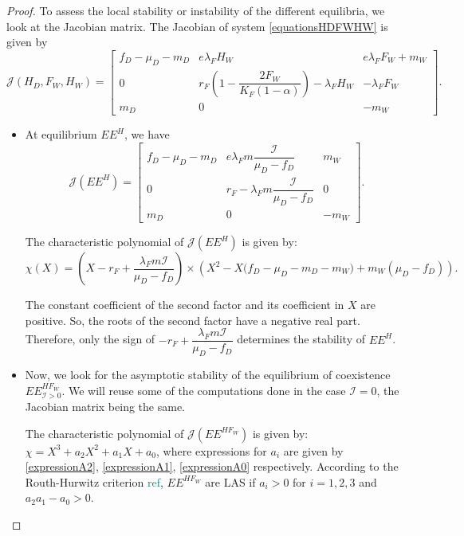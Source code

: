 \documentclass{article}
\newcommand{\lfw}{\lambda_{F}}
\newcommand{\lfw}{\lambda_{F}}
\newcommand{\cI}{\mathcal{I}}
\newcommand{\marc}[1]{\textcolor{teal}{#1}}
\begin{document}
\begin{proof}
To assess the local stability or instability of the different equilibria, we look at the Jacobian matrix. The Jacobian of system \eqref{equationsHDFWHW} is given by
\begin{equation*}
\mathcal{J}(H_D, F_W, H_W) = \begin{bmatrix}
f_D-\mu_D - m_D & e \lfw H_W & e\lfw F_W + m_W \\
0 & r_F \left( 1 - \dfrac{2F_W}{K_F(1-\alpha)} \right) - \lfw H_W & - \lfw F_W \\
m_D & 0 & -m_W
\end{bmatrix}.
\end{equation*}
\begin{itemize}
\item At equilibrium $EE^{H}$, we have
\begin{equation*}
\mathcal{J}(EE^{H}) = \begin{bmatrix}
f_D-\mu_D - m_D & e \lfw m \dfrac{\cI}{\mu_D - f_D} & m_W \\
0 & r_F - \lfw m \dfrac{\cI}{\mu_D - f_D} & 0 \\
m_D & 0 & -m_W
\end{bmatrix}.
\end{equation*}


The characteristic polynomial of $\mathcal{J}(EE^{H})$ is given by:
\begin{equation*}
\chi(X) = (X - r_F + \dfrac{\lfw m \cI}{\mu_D - f_D}) \times \left(X^2 - X\Big(f_D - \mu_D - m_D - m_W \Big) + m_W(\mu_D - f_D)\right).
\end{equation*}

The constant coefficient of the second factor and its coefficient in $X$ are positive. So, the roots of the second factor have a negative real part. Therefore, only the sign of $-r_F + \dfrac{\lfw m \cI}{\mu_D - f_D}$ determines the stability of $EE^{H}$.

\item Now, we look for the asymptotic stability of the equilibrium of coexistence $EE^{HF_W}_{\cI > 0}$. We will reuse some of the computations done in the case $\cI = 0$, the Jacobian matrix being the same.

The characteristic polynomial of $\mathcal{J}(EE^{H F_W})$ is given by: $\chi = X^3 + a_2 X^2 + a_1 X + a_0$, where expressions for $a_i$ are given by \eqref{expressionA2}, \eqref{expressionA1}, \eqref{expressionA0} respectively. According to the Routh-Hurwitz criterion \marc{ref}, $EE^{H F_W}$ are LAS if $a_i > 0$ for $i=1,2,3$ and $a_2 a_1 - a_0 > 0$.


\end{itemize}
\end{proof}
\end{document}
